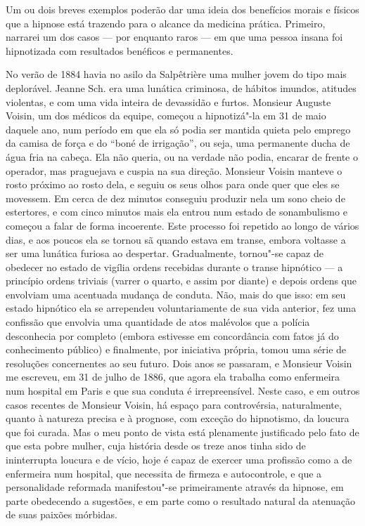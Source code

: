 Um ou dois breves exemplos poderão dar uma ideia dos benefícios morais e
físicos que a hipnose está trazendo para o alcance da medicina prática.
Primeiro, narrarei um dos casos --- por enquanto raros --- em que uma
pessoa insana foi hipnotizada com resultados benéficos e permanentes.

No verão de 1884 havia no asilo da Salpêtrière uma mulher jovem do tipo
mais deplorável.  Jeanne Sch. era uma lunática criminosa, de hábitos
imundos, atitudes violentas, e com uma vida inteira de devassidão e
furtos.  Monsieur Auguste Voisin, um dos médicos da equipe, começou a
hipnotizá"-la em 31 de maio daquele ano, num período em que ela só podia
ser mantida quieta pelo emprego da camisa de força e do “boné de
irrigação”, ou seja, uma permanente ducha de água fria na cabeça. Ela
não queria, ou na verdade não podia, encarar de frente o operador, mas
praguejava e cuspia na sua direção. Monsieur Voisin manteve o rosto
próximo ao rosto dela, e seguiu os seus olhos para onde quer que eles
se movessem. Em cerca de dez minutos conseguiu produzir nela um sono
cheio de estertores, e com cinco minutos mais ela entrou num estado de
sonambulismo e começou a falar de forma incoerente.  Este processo foi
repetido ao longo de vários dias, e aos poucos ela se tornou sã quando
estava em transe, embora voltasse a ser uma lunática furiosa ao
despertar.  Gradualmente, tornou"-se capaz de obedecer no estado de
vigília ordens recebidas durante o transe hipnótico --- a princípio
ordens triviais (varrer o quarto, e assim por diante) e depois ordens
que envolviam uma acentuada mudança de conduta.  Não, mais do que isso:
em seu estado hipnótico ela se arrependeu voluntariamente de sua vida
anterior, fez uma confissão que envolvia uma quantidade de atos
malévolos que a polícia desconhecia por completo (embora estivesse em
concordância com fatos já do conhecimento público) e finalmente, por
iniciativa própria, tomou uma série de resoluções concernentes ao seu
futuro.  Dois anos se passaram, e Monsieur Voisin me escreveu, em 31 de
julho de 1886, que agora ela trabalha como enfermeira num hospital em
Paris e que sua conduta é irrepreensível.  Neste caso, e em outros
casos recentes de Monsieur Voisin, há espaço para controvérsia,
naturalmente, quanto à natureza precisa e à prognose, com exceção do
hipnotismo, da loucura que foi curada.  Mas o meu ponto de vista está
plenamente justificado pelo fato de que esta pobre mulher, cuja
história desde os treze anos tinha sido de ininterrupta loucura e de
vício, hoje é capaz de exercer uma profissão como a de enfermeira num
hospital, que necessita de firmeza e autocontrole, e que a
personalidade reformada manifestou"-se primeiramente através da hipnose,
em parte obedecendo a sugestões, e em parte como o resultado natural da
atenuação de suas paixões mórbidas.

